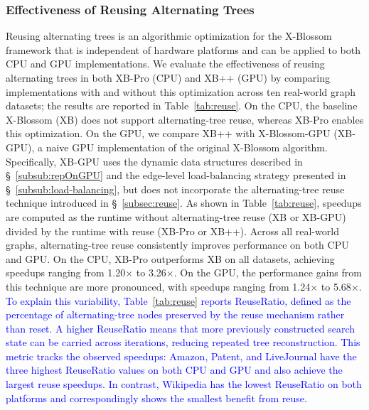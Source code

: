 \subsubsection{Effectiveness of Reusing Alternating Trees}
\label{subsub:exp_reuse}
Reusing alternating trees is an algorithmic optimization for the X-Blossom framework that is independent of hardware platforms and can be applied to both CPU and GPU implementations.
We evaluate the effectiveness of reusing alternating trees in both XB-Pro (CPU) and XB++ (GPU) by comparing implementations with and without this optimization across ten real-world graph datasets; the results are reported in Table~\ref{tab:reuse}.
On the CPU, the baseline X-Blossom (XB) does not support alternating-tree reuse, whereas XB-Pro enables this optimization.
On the GPU, we compare XB++ with X-Blossom-GPU (XB-GPU), a naive GPU implementation of the original X-Blossom algorithm.
Specifically, XB-GPU uses the dynamic data structures described in \S~\ref{subsub:repOnGPU} and the edge-level load-balancing strategy presented in \S~\ref{subsub:load-balancing}, but does not incorporate the alternating-tree reuse technique introduced in \S~\ref{subsec:reuse}.
As shown in Table~\ref{tab:reuse}, speedups are computed as the runtime without alternating-tree reuse (XB or XB-GPU) divided by the runtime with reuse (XB-Pro or XB++).
Across all real-world graphs, alternating-tree reuse consistently improves performance on both CPU and GPU.
On the CPU, XB-Pro outperforms XB on all datasets, achieving speedups ranging from 1.20$\times$ to 3.26$\times$.
On the GPU, the performance gains from this technique are more pronounced, with speedups ranging from 1.24$\times$ to 5.68$\times$.
\textcolor{blue}{To explain this variability, Table~\ref{tab:reuse} reports ReuseRatio, defined as the percentage of alternating-tree nodes preserved by the reuse mechanism rather than reset. 
A higher ReuseRatio means that more previously constructed search state can be carried across iterations, reducing repeated tree reconstruction. 
This metric tracks the observed speedups: Amazon, Patent, and LiveJournal have the three highest ReuseRatio values on both CPU and GPU and also achieve the largest reuse speedups. 
In contrast, Wikipedia has the lowest ReuseRatio on both platforms and correspondingly shows the smallest benefit from reuse.}





